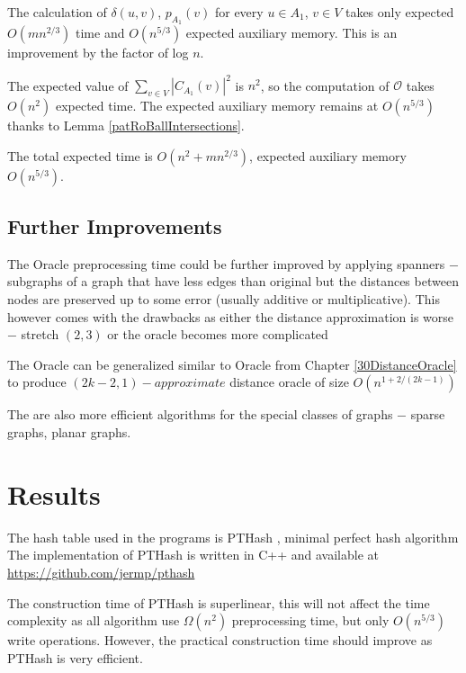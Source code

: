 \documentclass[shortabstract, lic, english]{iithesis}
\theoremstyle{definition} \newtheorem{definition}{Definition}[chapter]
\theoremstyle{remark} \newtheorem{remark}[definition]{Observation}
\theoremstyle{plain} \newtheorem{theorem}[definition]{Theorem}
\theoremstyle{plain} \newtheorem{lemma}[definition]{Lemma}
\theoremstyle{plain} \newtheorem{conjecture}[definition]{Conjecture}
\begin{document}
The calculation of $\delta(u,v)$, $p_{A_1}(v)$ for every $u \in A_1$, $v \in V$ takes only expected $O(mn^{2/3})$ time and $O(n^{5/3})$ expected auxiliary memory.
This is an improvement by the factor of log $n$.

The expected value of $\sum_{v \in V}|C_{A_1}(v)|^2$ is $n^2$, so the computation of $\mathcal{O}$ takes $O(n^2)$ expected time.
The expected auxiliary memory remains at $O(n^{5/3})$ thanks to Lemma \ref{patRoBallIntersections}.

The total expected time is $O(n^{2} + mn^{2/3})$, expected auxiliary memory $O(n^{5/3})$.

\section{Further Improvements}

The Oracle preprocessing time could be further improved by applying spanners $-$ subgraphs of a graph that have less edges than original
but the distances between nodes are preserved up to some error (usually additive or multiplicative).
This however comes with the drawbacks as either the distance approximation is worse $-$ stretch $(2,3)$ \cite{21OracleBasic} or the oracle becomes more complicated \cite{21OracleSpannerNoPenalty} \cite{21OracleSpannerNoPenaltyNoLog}

The Oracle can be generalized similar to Oracle from Chapter \ref{30DistanceOracle} to produce $(2k - 2, 1)-approximate$ distance oracle of size $O(n^{1 + 2/(2k-1)})$ \cite{a1Oracle}

The are also more efficient algorithms for the special classes of graphs $-$ sparse graphs, planar graphs.


\chapter{Results} \label{21PracticalComparison}

The hash table used in the programs is PTHash \cite{hashTablePractical}, minimal perfect hash algorithm
The implementation of PTHash is written in C++ and available at
\newline 
\url{https://github.com/jermp/pthash}

The construction time of PTHash is superlinear, this will not affect the time complexity as all algorithm use $\Omega(n^2)$ preprocessing time,
but only $O(n^{5/3})$ write operations. However, the practical construction time should improve as PTHash is very efficient.
\end{document}
